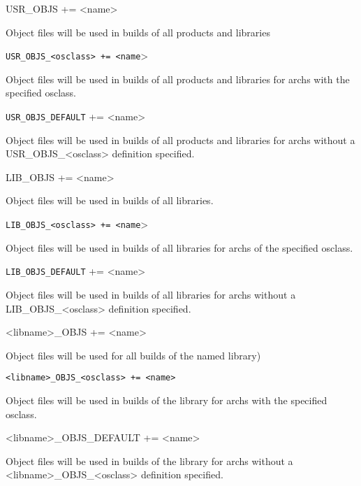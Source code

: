 \begin{description}

\item {}USR\_OBJS += \textless{}name\textgreater{}

Object files will be used in builds of all products and libraries

\item \verb|USR_OBJS_<osclass> += <name|\textgreater{}

Object files will be used in builds of all products and libraries for archs with the specified osclass.

\item \verb|USR_OBJS_DEFAULT| += \textless{}name\textgreater{}

Object files will be used in builds of all products and libraries for archs without a USR\_OBJS\_\textless{}osclass\textgreater{} 
definition specified.

\item {}LIB\_OBJS += \textless{}name\textgreater{}

Object files will be used in builds of all libraries.

\item \verb|LIB_OBJS_<osclass> += <name|\textgreater{}

Object files will be used in builds of all libraries for archs of the specified osclass.

\item \verb|LIB_OBJS_DEFAULT| += \textless{}name\textgreater{}

Object files will be used in builds of all libraries for archs without a LIB\_OBJS\_\textless{}osclass\textgreater{} definition 
specified.

\item \textless{}libname\textgreater{}\_OBJS += \textless{}name\textgreater{}

Object files will be used for all builds of the named library)

\item \verb|<libname>_OBJS_<osclass> += <name>| 

Object files will be used in builds of the library for archs with the specified osclass.

\item \textless{}libname\textgreater{}\_OBJS\_DEFAULT += \textless{}name\textgreater{}

Object files will be used in builds of the library for archs without a \textless{}libname\textgreater{}\_OBJS\_\textless{}osclass\textgreater{} definition 
specified.




\end{description}
